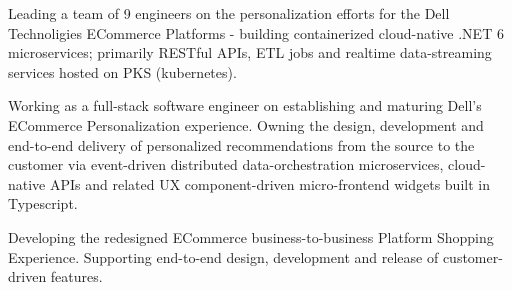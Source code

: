 \documentclass[10pt,a4paper,ragged2e,withhyper]{altacv}
\begin{document}
\begin{paracol}{2}


Leading a team of 9 engineers on the personalization efforts for the Dell Technoligies ECommerce Platforms  - 
building  containerized cloud-native .NET 6 microservices; primarily RESTful APIs, ETL jobs and realtime data-streaming services hosted on PKS (kubernetes).
\smallskip



\divider


Working as a full-stack software engineer on establishing and \newline 
maturing Dell's ECommerce Personalization experience. \newline 
Owning the design, development and end-to-end delivery of \newline
personalized recommendations from the source to the customer via event-driven distributed data-orchestration microservices, \newline
cloud-native APIs and related UX component-driven micro-frontend widgets built in Typescript.
\smallskip



\divider


Developing the redesigned ECommerce business-to-business   \newline 
Platform Shopping Experience. Supporting end-to-end design, \newline 
development and release of customer-driven features.


\end{paracol}
\end{document}

